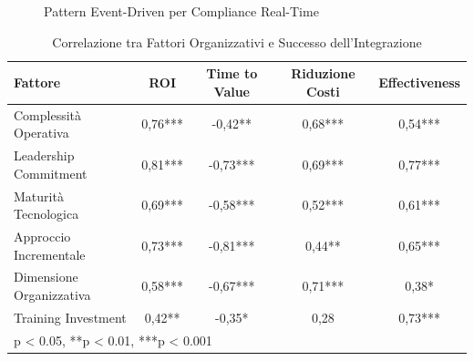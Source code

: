 \begin{figure}[htbp]
\caption{Pattern Event-Driven per Compliance Real-Time}
\label{fig:event_driven_pattern}
\end{figure}


\begin{table}[htbp]
\centering
\caption{Correlazione tra Fattori Organizzativi e Successo dell'Integrazione}
\label{tab:correlazioni}
\begin{tabular}{l c c c c}
\toprule
\textbf{Fattore} & \textbf{ROI} & \textbf{Time to Value} & \textbf{Riduzione Costi} & \textbf{Effectiveness} \\
\midrule
Complessità Operativa & 0,76*** & -0,42** & 0,68*** & 0,54*** \\
Leadership Commitment & 0,81*** & -0,73*** & 0,69*** & 0,77*** \\
Maturità Tecnologica & 0,69*** & -0,58*** & 0,52*** & 0,61*** \\
Approccio Incrementale & 0,73*** & -0,81*** & 0,44** & 0,65*** \\
Dimensione Organizzativa & 0,58*** & -0,67*** & 0,71*** & 0,38* \\
Training Investment & 0,42** & -0,35* & 0,28 & 0,73*** \\
\bottomrule
\multicolumn{5}{l}{\footnotesize *p < 0.05, **p < 0.01, ***p < 0.001}
\end{tabular}
\end{table}


